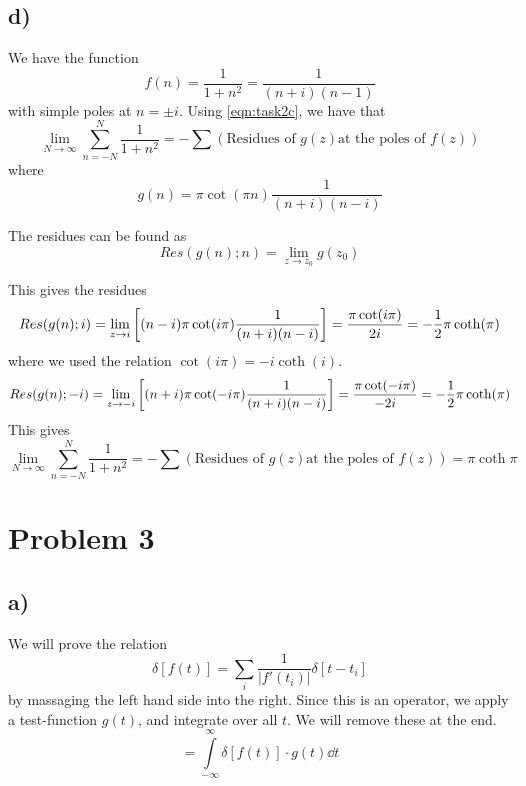 \documentclass[10pt,a4paper]{article}
\newcommand{\infint}{\int\limits_{-\infty}^{\infty}}
\newcommand{\limN}{\lim_{N\rightarrow \infty}}
\begin{document}
\subsection*{d)}
We have the function
\begin{equation}
    f(n) = \frac{1}{1+n^2} = \frac{1}{(n+i)(n-1)}
\end{equation}
with simple poles at $n = \pm i$. Using \ref{eqn:task2c}, we have that
\begin{equation}
    \limN \sum_{n=-N}^{N} \frac{1}{1+n^2} = - \sum(\text{Residues of } g(z) \text{at the poles of } f(z))
\end{equation}
where
\begin{equation}
    g(n) = \pi\cot(\pi n) \frac{1}{(n+i)(n-i)}
\end{equation}

The residues can be found as
\begin{equation}
    Res(g(n); n) = \lim_{z\rightarrow z_0} g(z_0)
\end{equation}

This gives the residues
\begin{align}
    Res(g(n); i) = \lim_{z\rightarrow i}\qty[(n-i)\pi\cot(i\pi)\frac{1}{(n+i)(n-i)}] = \frac{\pi\cot(i\pi)}{2i} = -\frac{1}{2}\pi\coth(\pi)
\end{align}
where we used the relation $\cot(i\pi) = -i\coth(i)$.
\begin{align}
    Res(g(n); -i) = \lim_{z\rightarrow -i}\qty[(n+i)\pi\cot(-i\pi)\frac{1}{(n+i)(n-i)}] = \frac{\pi\cot(-i\pi)}{-2i} = -\frac{1}{2}\pi\coth(\pi)
\end{align}
This gives
\begin{equation}
    \limN \sum_{n=-N}^{N} \frac{1}{1+n^2} = - \sum(\text{Residues of } g(z) \text{at the poles of } f(z)) = \pi \coth{\pi}
\end{equation}




\section*{Problem 3}
\subsection*{a)}
We will prove the relation
\begin{equation}\label{eqn:task3a}
    \delta[f(t)] = \sum_i \frac{1}{|f'(t_i)|}\delta[t-t_i]
\end{equation}
by massaging the left hand side into the right. Since this is an operator, we apply a test-function $g(t)$, and integrate over all $t$. We will remove these at the end.
\begin{equation}
    = \infint \delta[f(t)]\cdot g(t)\dd{t}
\end{equation}
\end{document}
